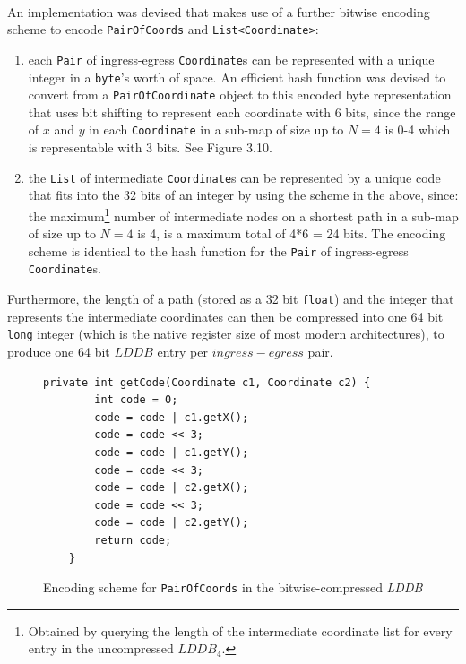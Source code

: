 \documentclass[12pt,notitlepage]{report}
\begin{document}
\\
\noindent
An implementation was devised that makes use of a further bitwise encoding scheme to encode {\tt PairOfCoords} and {\tt List<Coordinate>}:
\begin{enumerate}
\item each {\tt Pair} of ingress-egress {\tt Coordinate}s can be represented with a unique integer in a {\tt byte}'s worth of space. An efficient hash function was devised to convert from a {\tt PairOfCoordinate} object to this encoded byte representation that uses bit shifting to represent each coordinate with 6 bits, since the range of $x$ and $y$ in each {\tt Coordinate} in a sub-map of size up to {$N=4$} is 0-4 which is representable with 3 bits. See Figure 3.10.
\item the {\tt List} of intermediate {\tt Coordinate}s can be represented by a unique code that fits into the 32 bits of an integer by using the scheme in the above, since: the maximum\footnote{Obtained by querying the length of the intermediate coordinate list for every entry in the uncompressed $LDDB_{4}$.} number of intermediate nodes on a shortest path in a sub-map of size up to {$N=4$} is 4, is a maximum total of 4*6 = 24 bits. The encoding scheme is identical to the hash function for the {\tt Pair} of ingress-egress {\tt Coordinate}s.
\end{enumerate}

\noindent
Furthermore, the length of a path (stored as a 32 bit {\tt float}) and the integer that represents the intermediate coordinates can then be compressed into one 64 bit {\tt long} integer (which is the native register size of most modern architectures), to produce one 64 bit $LDDB$ entry per $ingress-egress$ pair.\\

\begin{figure}
\begin{lstlisting}
private int getCode(Coordinate c1, Coordinate c2) {
		int code = 0;
		code = code | c1.getX();
		code = code << 3;
		code = code | c1.getY();
		code = code << 3;
		code = code | c2.getX();
		code = code << 3;
		code = code | c2.getY();
		return code;	
	}
\end{lstlisting}
\caption{Encoding scheme for {\tt PairOfCoords} in the bitwise-compressed {\em LDDB}}
\end{figure}
\end{document}
